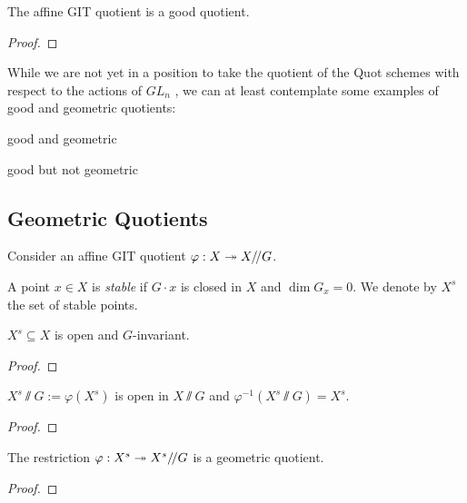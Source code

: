 \documentclass[12pt]{ociamthesis}  %
\begin{document}
\begin{example}
  \missingexample
\end{example}

\begin{theorem}
  The affine GIT quotient is a good quotient.
  \begin{proof}
    \missingproof
  \end{proof}
\end{theorem}

While we are not yet in a position to take the quotient of the Quot
schemes with respect to the actions of $GL_n$ ,
we can at least contemplate some examples of good and geometric
quotients:

\begin{example}
  good and geometric
  \missingexample
\end{example}

\begin{example}
  good but not geometric
  \missingexample
\end{example}

\subsection{Geometric Quotients}

Consider an affine GIT quotient $\varphi : X \twoheadrightarrow X/\!/ G$.

\begin{definition}\label{def:affine_stability}
  A point $x\in X$ is \emph{stable} if $G\cdot x$ is closed in $X$
  and $\dim G_x = 0$. We denote by $X^s$ the set of stable
  points. 
\end{definition}

\begin{lemma}
  $X^s \subseteq X$ is open and $G$-invariant.
  \begin{proof}
    \missingproof
  \end{proof}
\end{lemma}

\begin{lemma}
  $X^s\sslash G := \varphi(X^s)$ is open in $X\sslash G$ and
  $\varphi^{-1}(X^s\sslash G) = X^s$.
  \begin{proof}
    \missingproof
  \end{proof}
\end{lemma}

\begin{theorem}
  The restriction $\varphi : X^s \twoheadrightarrow X^s/\!/ G$ is a geometric quotient.
  \begin{proof}
    \missingproof
  \end{proof}
\end{theorem}
\end{document}
